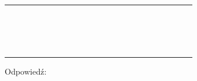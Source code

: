 \documentclass[10pt]{article}
\begin{document}
\begin{center}
\begin{tabular}{|c|c|c|c|c|c|c|c|c|c|c|c|c|c|c|c|c|c|c|c|c|c|c|}
\hline
 &  &  &  &  &  &  &  &  &  &  &  &  &  &  &  &  &  &  &  &  &  &  \\
\hline
 &  &  &  &  &  &  &  &  &  &  &  &  &  &  &  &  &  &  &  &  &  &  \\
\hline
 &  &  &  &  &  &  &  &  &  &  &  &  &  &  &  &  &  &  &  &  &  &  \\
\hline
 &  &  &  &  &  &  &  &  &  &  &  &  &  &  &  &  &  &  &  &  &  &  \\
\hline
 &  &  &  &  &  &  &  &  &  &  &  &  &  &  &  &  &  &  &  &  &  &  \\
\hline
 &  &  &  &  &  &  &  &  &  &  &  &  &  &  &  &  &  &  &  &  &  &  \\
\hline
 &  &  &  &  &  &  &  &  &  &  &  &  &  &  &  &  &  &  &  &  &  &  \\
\hline
 &  &  &  &  &  &  &  &  &  &  &  &  &  &  &  &  &  &  &  &  &  &  \\
\hline
 &  &  &  &  &  &  &  &  &  &  &  &  &  &  &  &  &  &  &  &  &  &  \\
\hline
 &  &  &  &  &  &  &  &  &  &  &  &  &  &  &  &  &  &  &  &  &  &  \\
\hline
 &  &  &  &  &  &  &  &  &  &  &  &  &  &  &  &  &  &  &  &  &  &  \\
\hline
 &  &  &  &  &  &  &  &  &  &  &  &  &  &  &  &  &  &  &  &  &  &  \\
\hline
 &  &  &  &  &  &  &  &  &  &  &  &  &  &  &  &  &  &  &  &  &  &  \\
\hline
 &  &  &  &  &  &  &  &  &  &  &  &  &  &  &  &  &  &  &  &  &  &  \\
\hline
 &  &  &  &  &  &  &  &  &  &  &  &  &  &  &  &  &  &  &  &  &  &  \\
\hline
 &  &  &  &  &  &  &  &  &  &  &  &  &  &  &  &  &  &  &  &  &  &  \\
\hline
 &  &  &  &  &  &  &  &  &  &  &  &  &  &  &  &  &  &  &  &  &  &  \\
\hline
 &  &  &  &  &  &  &  &  &  &  &  &  &  &  &  &  &  &  &  &  &  &  \\
\hline
\end{tabular}
\end{center}

Odpowiedź: \(\qquad\)
\end{document}
